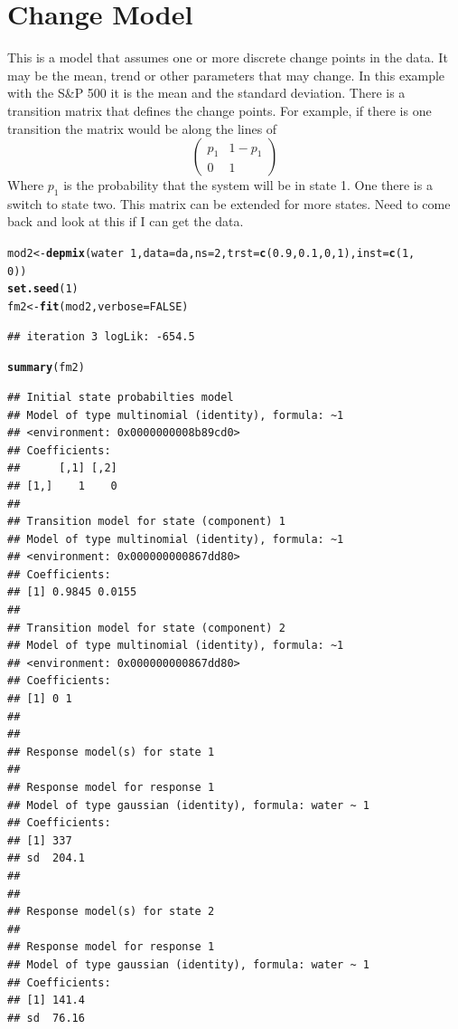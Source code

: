 \documentclass{article}\usepackage{graphicx, color}
\makeatletter
\newcommand{\hlfunctioncall}[1]{\textcolor[rgb]{0.501960784313725,0,0.329411764705882}{\textbf{#1}}}%
\newenvironment{kframe}{%
 \def\at@end@of@kframe{}%
 \ifinner\ifhmode%
  \def\at@end@of@kframe{\end{minipage}}%
  \begin{minipage}{\columnwidth}%
 \fi\fi%
 \def\FrameCommand##1{\hskip\@totalleftmargin \hskip-\fboxsep
 \colorbox{shadecolor}{##1}\hskip-\fboxsep
     \hskip-\linewidth \hskip-\@totalleftmargin \hskip\columnwidth}%
 \MakeFramed {\advance\hsize-\width
   \@totalleftmargin\z@ \linewidth\hsize
   \@setminipage}}%
 {\par\unskip\endMakeFramed%
 \at@end@of@kframe}
\newenvironment{knitrout}{}{} %
\makeatother
\begin{document}
\section{Change Model}
This is a model that assumes one or more discrete change points in the data. It may be the mean, trend or other parameters that may change. In this example with the S\&P 500 it is the mean and the standard deviation. There is a transition matrix that defines the change points.  For example, if there is one transition the matrix would be along the lines of 
\begin{equation*}
\begin{pmatrix}
p_1 & 1 - p_1 \\
0 & 1
\end{pmatrix}
\end{equation*}
Where $p_1$ is the probability that the system will be in state 1.  One there is a switch to state two.  This matrix can be extended for more states. Need to come back and look at this if I can get the data. 
\begin{knitrout}
\color{fgcolor}\begin{kframe}
\begin{alltt}
mod2 <- \hlfunctioncall{depmix}(water ~ 1, data = da, ns = 2, trst = \hlfunctioncall{c}(0.9, 0.1, 0, 1), inst = \hlfunctioncall{c}(1, 
    0))
\hlfunctioncall{set.seed}(1)
fm2 <- \hlfunctioncall{fit}(mod2, verbose = FALSE)
\end{alltt}
\begin{verbatim}
## iteration 3 logLik: -654.5
\end{verbatim}
\begin{alltt}
\hlfunctioncall{summary}(fm2)
\end{alltt}
\begin{verbatim}
## Initial state probabilties model 
## Model of type multinomial (identity), formula: ~1
## <environment: 0x0000000008b89cd0>
## Coefficients: 
##      [,1] [,2]
## [1,]    1    0
## 
## Transition model for state (component) 1 
## Model of type multinomial (identity), formula: ~1
## <environment: 0x000000000867dd80>
## Coefficients: 
## [1] 0.9845 0.0155
## 
## Transition model for state (component) 2 
## Model of type multinomial (identity), formula: ~1
## <environment: 0x000000000867dd80>
## Coefficients: 
## [1] 0 1
## 
## 
## Response model(s) for state 1 
## 
## Response model for response 1 
## Model of type gaussian (identity), formula: water ~ 1
## Coefficients: 
## [1] 337
## sd  204.1 
## 
## 
## Response model(s) for state 2 
## 
## Response model for response 1 
## Model of type gaussian (identity), formula: water ~ 1
## Coefficients: 
## [1] 141.4
## sd  76.16
\end{verbatim}
\end{kframe}
\end{knitrout}
\end{document}
